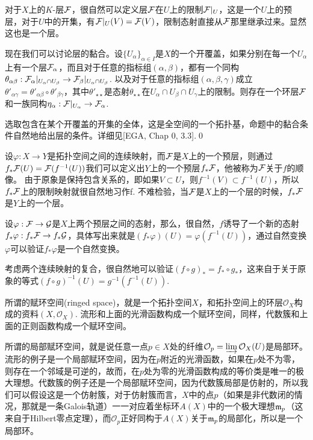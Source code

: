 \para 对于$X$上的$K$-层$\mathcal{F}$，很自然可以定义层$\mathcal{F}$在$U$上的限制$\mathcal{F}|_U$，这是一个$U$上的预层，对于$U$中的开集，有$\mathcal{F}|_U(V)=\mathcal{F}(V)$，限制态射直接从$\mathcal{F}$那里继承过来。显然这也是一个层。

\pro 现在我们可以讨论层的黏合。设$\{U_\alpha\}_{\alpha \in I}$是$X$的一个开覆盖，如果分别在每一个$U_\alpha$上有一个层$\mathcal{F}_\alpha$，而且对于任意的指标组$(\alpha,\beta)$，都有一个同构$\theta_{\alpha\beta}:\mathcal{F}_\alpha|_{U_\alpha\cap U_\beta}\to \mathcal{F}_\beta|_{U_\alpha\cap U_\beta}$. 以及对于任意的指标组$(\alpha,\beta,\gamma)$成立$\theta'_{\alpha\gamma}=\theta'_{\alpha\beta}\circ \theta'_{\beta\gamma}$，其中$\theta'_{\star\star}$是态射$\theta_{\star\star}$在$U_\alpha\cap U_\beta \cap U_\gamma$上的限制。则存在一个环层$\mathcal{F}$和一族同构$\eta_\alpha:\mathcal{F}|_{U_\alpha}\to \mathcal{F}_\alpha$.

\proof 选取包含在某个开覆盖的开集的全体，这是全空间的一个拓扑基，命题中的黏合条件自然地给出层的条件。详细见[EGA, Chap 0, 3.3].\qed

\para 设$\varphi:X\to Y$是拓扑空间之间的连续映射，而$\mathcal{F}$是$X$上的一个预层，则通过$f_*\mathcal{F}(U)=\mathcal{F}(f^{-1}(U))$我们可以定义出$Y$上的一个预层$f_*\mathcal{F}$，他被称为$\mathcal{F}$关于$f$的顺像。 由于原象是保持包含关系的，即如果$V\subset U$，则$f^{-1}(V)\subset f^{-1}(U)$，所以$f_*\mathcal{F}$上的限制映射就很自然地习作f. 不难检验，当$\mathcal{F}$是$X$上的一个层的时候，$f_*\mathcal{F}$是$Y$上的一个层。

设$\varphi:\mathcal{F}\to\mathcal{G}$是$X$上两个预层之间的态射，那么，很自然，$f$诱导了一个新的态射$f_*\varphi:f_*\mathcal{F}\to f_*\mathcal{G}$，具体写出来就是$(f_*\varphi)(U)=\varphi(f^{-1}(U))$，通过自然变换$\varphi$可以验证$f_*\varphi$是一个自然变换。

考虑两个连续映射的复合，很自然地可以验证$(f\circ g)_*=f_*\circ g_*$，这来自于关于原象的等式$(f\circ g)^{-1}(U)=g^{-1}(f^{-1}(U))$.

\para 所谓的赋环空间(ringed space)，就是一个拓扑空间$X$，和拓扑空间上的环层$\mathcal{O}_X$构成的资料$(X,\mathcal{O}_X)$. 流形和上面的光滑函数构成一个赋环空间，同样，代数簇和上面的正则函数构成一个赋环空间。

所谓的局部赋环空间，就是说任意一点$p\in X$处的纤维$\mathcal{O}_p=\varinjlim \mathcal{O}_X(U)$是局部环。流形的例子是一个局部赋环空间，因为在$p$附近的光滑函数，如果在$p$处不为零，则存在一个邻域是可逆的，故而，在$p$处为零的光滑函数构成的等价类是唯一的极大理想。代数簇的例子还是一个局部赋环空间，因为代数簇局部是仿射的，所以我们可以假设这是一个仿射簇，对于仿射簇而言，$X$中的点$p$（如果是非代数闭的情况，那就是一条Galois轨道）一一对应着坐标环$A(X)$中的一个极大理想$\mathfrak{m}_p$（这来自于Hilbert零点定理），而$\mathcal{O}_p$正好同构于$A(X)$关于$\mathfrak{m}_p$的局部化，所以是一个局部环。

